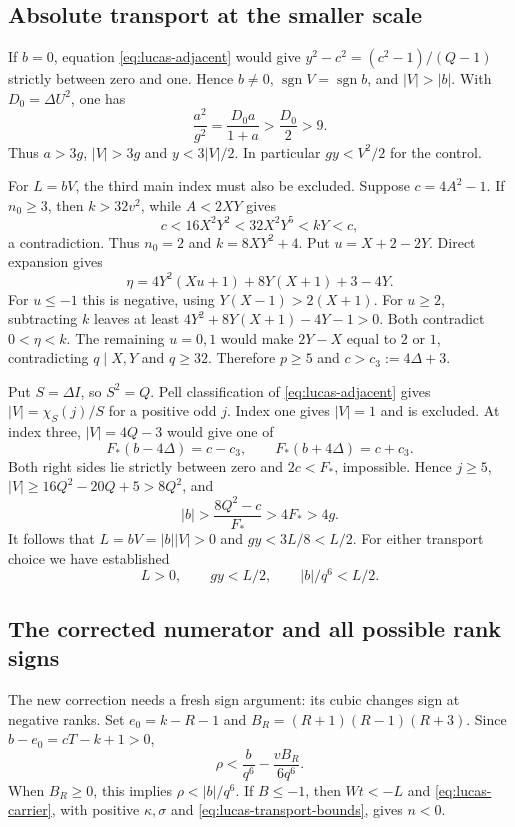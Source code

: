 \documentclass[11pt,letterpaper]{article}
\theoremstyle{definition}
\theoremstyle{remark}
\begin{document}
\subsection{Absolute transport at the smaller scale}

If $b=0$, equation \eqref{eq:lucas-adjacent} would give
$y^2-c^2=(c^2-1)/(Q-1)$ strictly between zero and one.  Hence $b\ne0$,
$\operatorname{sgn}V=\operatorname{sgn}b$, and $|V|>|b|$.  With
$D_0=\Delta U^2$, one has
\[
 \frac{a^2}{g^2}=\frac{D_0a}{1+a}>\frac{D_0}{2}>9.
\]
Thus $a>3g$, $|V|>3g$ and $y<3|V|/2$.  In particular
$gy<V^2/2$ for the control.

For $L=bV$, the third main index must also be excluded.  Suppose
$c=4A^2-1$.  If $n_0\ge3$, then $k>32v^2$, while $A<2XY$ gives
\[
 c<16X^2Y^2<32X^2Y^5<kY<c,
\]
a contradiction.  Thus $n_0=2$ and $k=8XY^2+4$.  Put
$u=X+2-2Y$.  Direct expansion gives
\[
 \eta=4Y^2(Xu+1)+8Y(X+1)+3-4Y.
\]
For $u\le-1$ this is negative, using $Y(X-1)>2(X+1)$.  For $u\ge2$,
subtracting $k$ leaves at least $4Y^2+8Y(X+1)-4Y-1>0$.  Both contradict
$0<\eta<k$.  The remaining $u=0,1$ would make $2Y-X$ equal to $2$ or $1$,
contradicting $q\mid X,Y$ and $q\ge32$.  Therefore $p\ge5$ and
$c>c_3:=4\Delta+3$.

Put $S=\Delta I$, so $S^2=Q$.  Pell classification of
\eqref{eq:lucas-adjacent} gives $|V|=\chi_S(j)/S$ for a positive odd $j$.
Index one gives $|V|=1$ and is excluded.  At index three,
$|V|=4Q-3$ would give one of
\[
 F_*(b-4\Delta)=c-c_3,\qquad F_*(b+4\Delta)=c+c_3.
\]
Both right sides lie strictly between zero and $2c<F_*$, impossible.
Hence $j\ge5$, $|V|\ge16Q^2-20Q+5>8Q^2$, and
\[
 |b|>\frac{8Q^2-c}{F_*}>4F_*>4g.
\]
It follows that $L=bV=|b||V|>0$ and $gy<3L/8<L/2$.  For either transport
choice we have established
\begin{equation}
 L>0,\qquad gy<L/2,\qquad |b|/q^6<L/2.
 \label{eq:lucas-transport-bounds}
\end{equation}

\subsection{The corrected numerator and all possible rank signs}

The new correction needs a fresh sign argument: its cubic changes sign at
negative ranks.  Set $e_0=k-R-1$ and
$B_R=(R+1)(R-1)(R+3)$.  Since $b-e_0=cT-k+1>0$,
\[
 \rho<\frac b{q^6}-\frac{vB_R}{6q^6}.
\]
When $B_R\ge0$, this implies $\rho<|b|/q^6$.  If $B\le-1$, then
$Wt<-L$ and \eqref{eq:lucas-carrier}, with positive $\kappa,\sigma$ and
\eqref{eq:lucas-transport-bounds}, gives $n<0$.
\end{document}
